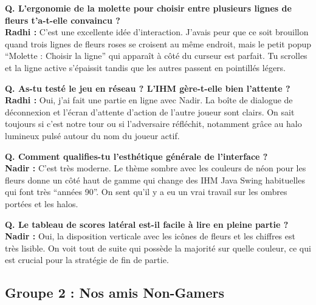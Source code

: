 \documentclass[11pt,a4paper]{article}
\begin{document}
\begin{tcolorbox}[gamerbox, title={Radhi -- 23 ans, développeur amateur et joueur de jeux de plateau}]
    \textbf{Q. L'ergonomie de la molette pour choisir entre plusieurs lignes de fleurs t'a-t-elle convaincu ?}\\
    \textbf{Radhi :} C'est une excellente idée d'interaction. J'avais peur que ce soit brouillon quand trois lignes de fleurs roses se croisent au même endroit, mais le petit popup ``Molette : Choisir la ligne'' qui apparaît à côté du curseur est parfait. Tu scrolles et la ligne active s'épaissit tandis que les autres passent en pointillés légers.

    \textbf{Q. As-tu testé le jeu en réseau ? L'IHM gère-t-elle bien l'attente ?}\\
    \textbf{Radhi :} Oui, j'ai fait une partie en ligne avec Nadir. La boîte de dialogue de déconnexion et l'écran d'attente d'action de l'autre joueur sont clairs. On sait toujours si c'est notre tour ou si l'adversaire réfléchit, notamment grâce au halo lumineux pulsé autour du nom du joueur actif.
\end{tcolorbox}

\begin{tcolorbox}[gamerbox, title={Nadir -- 22 ans, joueur de jeux de cartes en ligne}]
    \textbf{Q. Comment qualifies-tu l'esthétique générale de l'interface ?}\\
    \textbf{Nadir :} C'est très moderne. Le thème sombre avec les couleurs de néon pour les fleurs donne un côté haut de gamme qui change des IHM Java Swing habituelles qui font très ``années 90''. On sent qu'il y a eu un vrai travail sur les ombres portées et les halos.

    \textbf{Q. Le tableau de scores latéral est-il facile à lire en pleine partie ?}\\
    \textbf{Nadir :} Oui, la disposition verticale avec les icônes de fleurs et les chiffres est très lisible. On voit tout de suite qui possède la majorité sur quelle couleur, ce qui est crucial pour la stratégie de fin de partie.
\end{tcolorbox}

\subsection{Groupe 2 : Nos amis Non-Gamers}
\end{document}
